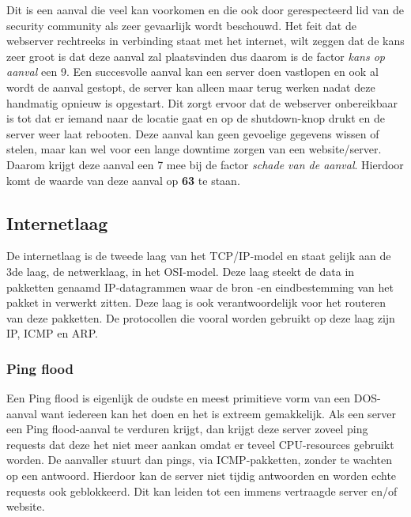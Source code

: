 \documentclass[pdftex,a4paper,12pt]{report}
\begin{document}
Dit is een aanval die veel kan voorkomen en die ook door gerespecteerd lid van de security community \cite{Bown2013} als zeer gevaarlijk wordt beschouwd. Het feit dat de webserver rechtreeks in verbinding staat met het internet, wilt zeggen dat de kans zeer groot is dat deze aanval zal plaatsvinden dus daarom is de factor \textit{kans op aanval} een 9. Een succesvolle aanval kan een server doen vastlopen en ook al wordt de aanval gestopt, de server kan alleen maar terug werken nadat deze handmatig opnieuw is opgestart. Dit zorgt ervoor dat de webserver onbereikbaar is tot dat er iemand naar de locatie gaat en op de shutdown-knop drukt en de server weer laat rebooten. Deze aanval kan geen gevoelige gegevens wissen of stelen, maar kan wel voor een lange downtime zorgen van een website/server. Daarom krijgt deze aanval een 7 mee bij de factor \textit{schade van de aanval}. Hierdoor komt de waarde van deze aanval op \textbf{63} te staan.

\subsection{Internetlaag}
De internetlaag is de tweede laag van het TCP/IP-model en staat gelijk aan de 3de laag, de netwerklaag, in het OSI-model. Deze laag steekt de data in pakketten genaamd IP-datagrammen waar de bron -en eindbestemming van het pakket in verwerkt zitten. Deze laag is ook verantwoordelijk voor het routeren van deze pakketten. De protocollen die vooral worden gebruikt op deze laag zijn IP, ICMP en ARP. \citep{Thomas2013}

\subsubsection{Ping flood}
Een Ping flood is eigenlijk de oudste en meest primitieve vorm van een DOS-aanval want iedereen kan het doen en het is extreem gemakkelijk. Als een server een Ping flood-aanval te verduren krijgt, dan krijgt deze server zoveel ping requests dat deze het niet meer aankan omdat er teveel CPU-resources gebruikt worden. De aanvaller stuurt dan pings, via ICMP-pakketten, zonder te wachten op een antwoord. Hierdoor kan de server niet tijdig antwoorden en worden echte requests ook geblokkeerd. Dit kan leiden tot een immens vertraagde server en/of website. \citep{Grid2010}
\end{document}

